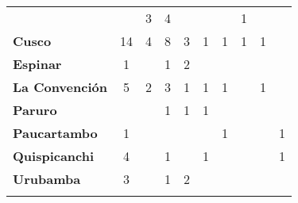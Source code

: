 \begin{tabular}{lccccccccc}
	&\cellcolor[HTML]{FCC46C}					&3
	&4											&\cellcolor[HTML]{FCC46C}
	&\cellcolor[HTML]{FCC46C}					&\cellcolor[HTML]{FCC46C}
	&1											&\cellcolor[HTML]{FCC46C}
	&\cellcolor[HTML]{FCC46C}\\
	\textbf{Cusco}                            											
	&14 										&4
	&8											&3
	&1											&1
	&1											&1
	&\cellcolor[HTML]{FCC46C}\\
	\textbf{Espinar}       					             								&1
	&\cellcolor[HTML]{FCC46C}					&1
	&2											&\cellcolor[HTML]{FCC46C}	
	&\cellcolor[HTML]{FCC46C} 					&\cellcolor[HTML]{FCC46C}
	&\cellcolor[HTML]{FCC46C}					&\cellcolor[HTML]{FCC46C}\\
	\textbf{La Convención}                      					
	&5
	&2											&3
	&1 											&1 
	&1											&\cellcolor[HTML]{FCC46C}
	&1											&\cellcolor[HTML]{FCC46C}\\
	\textbf{Paruro}                            					
	&\cellcolor[HTML]{FCC46C}
	&\cellcolor[HTML]{FCC46C} 					&1
	&1											&1
	&\cellcolor[HTML]{FCC46C}					&\cellcolor[HTML]{FCC46C}
	&\cellcolor[HTML]{FCC46C}					&\cellcolor[HTML]{FCC46C}\\
	\textbf{Paucartambo}               		                       						
	&1											&\cellcolor[HTML]{FCC46C}
	&\cellcolor[HTML]{FCC46C}
	&\cellcolor[HTML]{FCC46C}					&\cellcolor[HTML]{FCC46C}
	&1											&\cellcolor[HTML]{FCC46C}
	&\cellcolor[HTML]{FCC46C}					&1\\
	\textbf{Quispicanchi}                                         	                 	
	&4											&\cellcolor[HTML]{FCC46C}
	&1											&\cellcolor[HTML]{FCC46C}
	&1											&\cellcolor[HTML]{FCC46C}
	&\cellcolor[HTML]{FCC46C}					&\cellcolor[HTML]{FCC46C}
	&1\\
	\textbf{Urubamba}                                                          			
	&3
	&\cellcolor[HTML]{FCC46C}					&1
	&2											&\cellcolor[HTML]{FCC46C}
	&\cellcolor[HTML]{FCC46C}					&\cellcolor[HTML]{FCC46C}
	&\cellcolor[HTML]{FCC46C} 					&\cellcolor[HTML]{FCC46C}\\	
	&\multicolumn{1}{l}{}                       &\multicolumn{1}{l}{}            &\multicolumn{1}{l}{}                         
	&\multicolumn{1}{l}{}                       &\multicolumn{1}{l}{}            &\multicolumn{1}{l}{}                       &\multicolumn{1}{l}{}                       &\multicolumn{1}{l}{}            &\multicolumn{1}{l}{}    
\end{tabular}